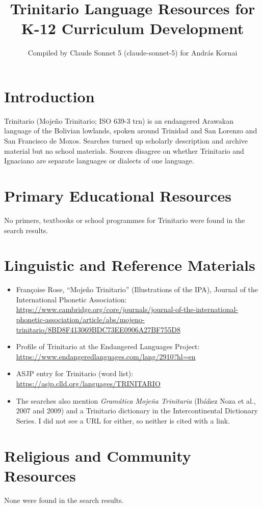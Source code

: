 \documentclass[12pt]{article}
\title{Trinitario Language Resources for K-12 Curriculum Development}
\author{Compiled by Claude Sonnet 5 (claude-sonnet-5) for Andr\'as Kornai}
\date{}
\begin{document}
\maketitle

\section{Introduction}
Trinitario (Mojeño Trinitario; ISO 639-3 trn) is an endangered Arawakan language of the Bolivian lowlands, spoken around Trinidad and San Lorenzo and San Francisco de Moxos. Searches turned up scholarly description and archive material but no school materials. Sources disagree on whether Trinitario and Ignaciano are separate languages or dialects of one language.

\section{Primary Educational Resources}
No primers, textbooks or school programmes for Trinitario were found in the search results.

\section{Linguistic and Reference Materials}
\begin{itemize}
\item Fran\c{c}oise Rose, ``Mojeño Trinitario'' (Illustrations of the IPA), Journal of the International Phonetic Association: \url{https://www.cambridge.org/core/journals/journal-of-the-international-phonetic-association/article/abs/mojeno-trinitario/8BD8F413069BDC73EE0906A27BF755D8}
\item Profile of Trinitario at the Endangered Languages Project: \url{https://www.endangeredlanguages.com/lang/2910?hl=en}
\item ASJP entry for Trinitario (word list): \url{https://asjp.clld.org/languages/TRINITARIO}
\item The searches also mention \emph{Gram\'atica Moje\~na Trinitaria} (Ib\'a\~nez Noza et al., 2007 and 2009) and a Trinitario dictionary in the Intercontinental Dictionary Series. I did not see a URL for either, so neither is cited with a link.
\end{itemize}

\section{Religious and Community Resources}
None were found in the search results.
\end{document}
